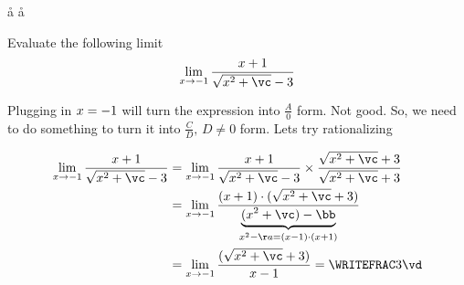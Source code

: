 



\SQUARE\va\aa
\SQUARE\vb\bb
\SUBTRACT\bb\aa\vc

\MULTIPLY{}\vd

\question[4] Evaluate the following limit \[ \lim_{x\to -\va}\dfrac{x + \va}{\sqrt{x^2 + \vc} - \vb} \] 

\watchout


\begin{solution}[\halfpage]
  Plugging in $x = -1$ will turn the expression into $\frac{A}{0}$ form. Not good. So, we need to 
  do something to turn it into $\frac{C}{D},\, D\neq 0$ form. Lets try rationalizing 

  \begin{align}
    \lim_{x\to -\va}\dfrac{x + \va}{\sqrt{x^2 + \vc} - \vb} &= 
    \lim_{x\to -\va}\dfrac{x + \va}{\sqrt{x^2 + \vc} - \vb}\times\dfrac{\sqrt{x^2 + \vc} + \vb}{\sqrt{x^2 + \vc} + \vb}  \\
    &= \lim_{x\to -\va}\dfrac{(x + \va)\cdot(\sqrt{x^2 + \vc} + \vb)}
    {\underbrace{(x^2 + \vc) - \bb}_{x^2-\aa = (x-\va)\cdot(x+\va)}} \\
    &= \lim_{x\to -\va}\dfrac{(\sqrt{x^2 + \vc} + \vb)}{x-\va} = \WRITEFRAC\vb\vd
  \end{align}
\end{solution}

\ifprintanswers\begin{codex}\end{codex}\fi

